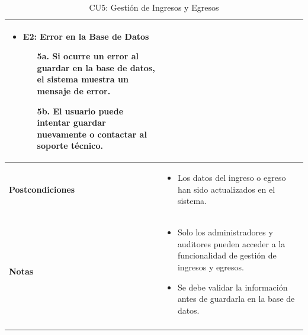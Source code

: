 \documentclass{article}
\begin{document}
\begin{longtable}{|l|p{10cm}|}
\begin{itemize}
    \item \textbf{E2: Error en la Base de Datos}
    \begin{enumerate}
        \item[5a.] Si ocurre un error al guardar en la base de datos, el sistema muestra un mensaje de error.
        \item[5b.] El usuario puede intentar guardar nuevamente o contactar al soporte técnico.
    \end{enumerate}
\end{itemize} \\ \hline
\textbf{Postcondiciones} & 
\begin{itemize}
    \item Los datos del ingreso o egreso han sido actualizados en el sistema.
\end{itemize} \\ \hline
\textbf{Notas} & 
\begin{itemize}
    \item Solo los administradores y auditores pueden acceder a la funcionalidad de gestión de ingresos y egresos.
    \item Se debe validar la información antes de guardarla en la base de datos.
\end{itemize} \\ \hline
\caption{CU5: Gestión de Ingresos y Egresos}
\end{longtable}

\newpage
\end{document}
